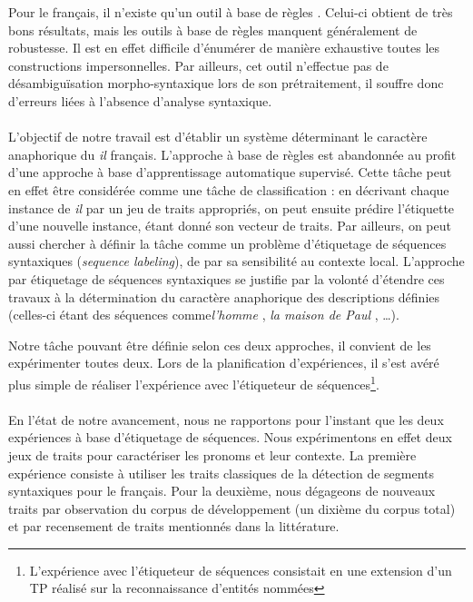 \documentclass[a4paper,12pt]{article}
\begin{document}
Pour le français, il n'existe qu'un outil à base de règles \citep{danlos-ilimp-taln2005}. Celui-ci obtient de très bons résultats, mais les outils à base de règles manquent généralement de robustesse. Il est en effet difficile d'énumérer de manière exhaustive toutes les constructions impersonnelles. Par ailleurs, cet outil n'effectue pas de désambiguïsation morpho-syntaxique lors de son prétraitement, il souffre donc d'erreurs liées à l'absence d'analyse syntaxique.

\paragraph{}
L'objectif de notre travail est d'établir un système déterminant le caractère anaphorique du \og{}\textit{il}\fg{} français. L'approche à base de règles est abandonnée au profit d'une approche à base d'apprentissage automatique supervisé. Cette tâche peut en effet être considérée comme une tâche de classification : en décrivant chaque instance de \og \textit{il} \fg{} par un jeu de traits appropriés, on peut ensuite prédire l'étiquette d'une nouvelle instance, étant donné son vecteur de traits. Par ailleurs, on peut aussi chercher à définir la tâche comme un problème d'étiquetage de séquences syntaxiques (\emph{sequence labeling}), de par sa sensibilité au contexte local. L'approche par étiquetage de séquences syntaxiques se justifie par la volonté d'étendre ces travaux à la détermination du caractère anaphorique des descriptions définies (celles-ci étant des séquences comme\og \textit{l'homme} \fg{}, \og \textit{la maison de Paul} \fg{}, \ldots).

Notre tâche pouvant être définie selon ces deux approches, il convient de les expérimenter toutes deux. Lors de la planification d'expériences, il s'est avéré plus simple de réaliser l'expérience avec l'étiqueteur de séquences\footnote{\samepage L'expérience avec l'étiqueteur de séquences consistait en une extension d'un TP réalisé sur la reconnaissance d'entités nommées}.

\paragraph{}
En l'état de notre avancement, nous ne rapportons pour l'instant que les deux expériences à base d'étiquetage de séquences.
Nous expérimentons en effet deux jeux de traits pour caractériser les pronoms et leur contexte.
La première expérience consiste à utiliser les traits classiques de la détection de segments syntaxiques pour le français. Pour la deuxième, nous dégageons de nouveaux traits par observation du corpus de développement (un dixième du corpus total) et par recensement de traits mentionnés dans la littérature.
\end{document}
